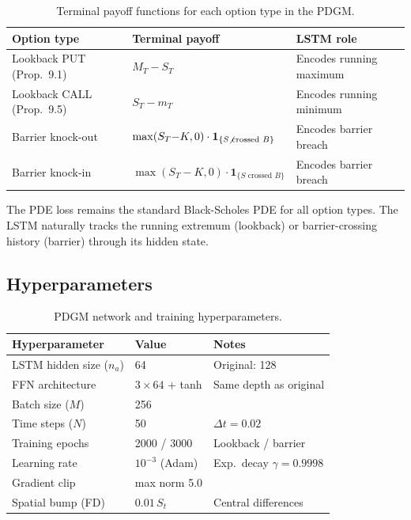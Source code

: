 \documentclass[12pt,a4paper]{article}
\begin{document}
\begin{table}[H]
\centering
\caption{Terminal payoff functions for each option type in the PDGM.}
\label{tab:pdgm_payoffs}
\begin{tabular}{L{3.8cm} L{5.5cm} L{4cm}}
\toprule
\textbf{Option type} & \textbf{Terminal payoff} & \textbf{LSTM role} \\
\midrule
Lookback PUT (Prop.~9.1)  & $M_T - S_T$ & Encodes running maximum \\
Lookback CALL (Prop.~9.5) & $S_T - m_T$ & Encodes running minimum \\
Barrier knock-out         & $\max(S_T{-}K,0)\cdot\mathbf{1}_{\{S \not\text{ crossed } B\}}$ & Encodes barrier breach \\
Barrier knock-in          & $\max(S_T{-}K,0)\cdot\mathbf{1}_{\{S\text{ crossed }B\}}$ & Encodes barrier breach \\
\bottomrule
\end{tabular}
\end{table}

The PDE loss remains the standard Black-Scholes PDE for all option types.
The LSTM naturally tracks the running extremum (lookback) or barrier-crossing
history (barrier) through its hidden state.

\subsection{Hyperparameters}

\begin{table}[H]
\centering
\caption{PDGM network and training hyperparameters.}
\label{tab:pdgm_hyper}
\begin{tabular}{L{5cm} C{3cm} L{4.5cm}}
\toprule
\textbf{Hyperparameter} & \textbf{Value} & \textbf{Notes} \\
\midrule
LSTM hidden size ($n_a$) & 64          & Original: 128 \\
FFN architecture         & $3\times64$ + tanh & Same depth as original \\
Batch size ($M$)         & 256         & \\
Time steps ($N$)         & 50          & $\Delta t = 0.02$ \\
Training epochs          & 2000 / 3000 & Lookback / barrier \\
Learning rate            & $10^{-3}$ (Adam) & Exp.\ decay $\gamma=0.9998$ \\
Gradient clip            & max norm 5.0 & \\
Spatial bump (FD)        & $0.01\,S_t$ & Central differences \\
\bottomrule
\end{tabular}
\end{table}
\end{document}
